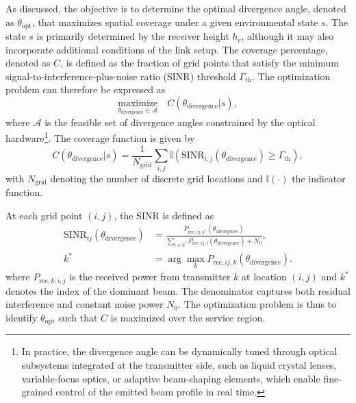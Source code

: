 \documentclass[twocolumn,twoside]{IEEEtran}
\theoremstyle{break}
\begin{document}
	As discussed, the objective is to determine the optimal divergence angle, denoted as $\theta_{\text{opt}}$, that maximizes spatial coverage under a given environmental state $s$. The state $s$ is primarily determined by the receiver height $h_r$, although it may also incorporate additional conditions of the link setup.
	The coverage percentage, denoted as $C$, is defined as the fraction of grid points that satisfy the minimum signal-to-interference-plus-noise ratio (SINR) threshold $\Gamma_{\text{th}}$. The optimization problem can therefore be expressed as
	\begin{equation}
		\label{opt-problem}
		\underset{\theta_{\text{divergence}} \in \mathcal{A}}{\text{maximize}} \quad C(\theta_{\text{divergence}} | s),
	\end{equation}
	where $\mathcal{A}$ is the feasible set of divergence angles constrained by the optical hardware\footnote{In practice, the divergence angle can be dynamically tuned through optical subsystems integrated at the transmitter side, such as liquid crystal lenses, variable-focus optics, or adaptive beam-shaping elements, which enable fine-grained control of the emitted beam profile in real time\cite{vlenses,vlenses2,liquidlens}.}. The coverage function is given by
	\begin{equation}
		C(\theta_{\text{divergence}} | s) = \frac{1}{N_{\text{grid}}} \sum_{i,j} \mathbb{I}\!\left( \text{SINR}_{i,j}(\theta_{\text{divergence}}) \geq \Gamma_{\text{th}} \right),
	\end{equation}
	with $N_{\text{grid}}$ denoting the number of discrete grid locations and $\mathbb{I}(\cdot)$ the indicator function.
	
	At each grid point $(i, j)$, the SINR is defined as
	\begin{equation}
		\label{eq:SINR}
		\begin{split}
			\text{SINR}_{ij}(\theta_{\text{divergence}}) &=
			\frac{P_{\text{rec},ij,k^*}(\theta_{\text{divergence}})}
			{\sum_{l \neq k^*} P_{\text{rec},ij,l}(\theta_{\text{divergence}}) + N_0}, \\
			k^* &= \arg\max_k P_{\text{rec},ij,k}(\theta_{\text{divergence}}).
		\end{split}
	\end{equation}
	where $P_{\text{rec}, k, i, j}$ is the received power from transmitter $k$ at location $(i, j)$ and $k^{*}$ denotes the index of the dominant beam. The denominator captures both residual interference and constant noise power $N_0$. The optimization problem is thus to identify $\theta_{\text{opt}}$ such that $C$ is maximized over the service region.
	
\end{document}
